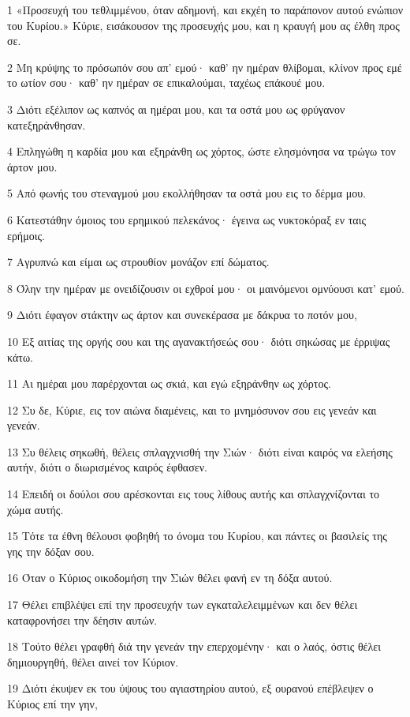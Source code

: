 \par 1 «Προσευχή του τεθλιμμένου, όταν αδημονή, και εκχέη το παράπονον αυτού ενώπιον του Κυρίου.» Κύριε, εισάκουσον της προσευχής μου, και η κραυγή μου ας έλθη προς σε.
\par 2 Μη κρύψης το πρόσωπόν σου απ' εμού· καθ' ην ημέραν θλίβομαι, κλίνον προς εμέ το ωτίον σου· καθ' ην ημέραν σε επικαλούμαι, ταχέως επάκουέ μου.
\par 3 Διότι εξέλιπον ως καπνός αι ημέραι μου, και τα οστά μου ως φρύγανον κατεξηράνθησαν.
\par 4 Επληγώθη η καρδία μου και εξηράνθη ως χόρτος, ώστε ελησμόνησα να τρώγω τον άρτον μου.
\par 5 Από φωνής του στεναγμού μου εκολλήθησαν τα οστά μου εις το δέρμα μου.
\par 6 Κατεστάθην όμοιος του ερημικού πελεκάνος· έγεινα ως νυκτοκόραξ εν ταις ερήμοις.
\par 7 Αγρυπνώ και είμαι ως στρουθίον μονάζον επί δώματος.
\par 8 Όλην την ημέραν με ονειδίζουσιν οι εχθροί μου· οι μαινόμενοι ομνύουσι κατ' εμού.
\par 9 Διότι έφαγον στάκτην ως άρτον και συνεκέρασα με δάκρυα το ποτόν μου,
\par 10 Εξ αιτίας της οργής σου και της αγανακτήσεώς σου· διότι σηκώσας με έρριψας κάτω.
\par 11 Αι ημέραι μου παρέρχονται ως σκιά, και εγώ εξηράνθην ως χόρτος.
\par 12 Συ δε, Κύριε, εις τον αιώνα διαμένεις, και το μνημόσυνον σου εις γενεάν και γενεάν.
\par 13 Συ θέλεις σηκωθή, θέλεις σπλαγχνισθή την Σιών· διότι είναι καιρός να ελεήσης αυτήν, διότι ο διωρισμένος καιρός έφθασεν.
\par 14 Επειδή οι δούλοι σου αρέσκονται εις τους λίθους αυτής και σπλαγχνίζονται το χώμα αυτής.
\par 15 Τότε τα έθνη θέλουσι φοβηθή το όνομα του Κυρίου, και πάντες οι βασιλείς της γης την δόξαν σου.
\par 16 Όταν ο Κύριος οικοδομήση την Σιών θέλει φανή εν τη δόξα αυτού.
\par 17 Θέλει επιβλέψει επί την προσευχήν των εγκαταλελειμμένων και δεν θέλει καταφρονήσει την δέησιν αυτών.
\par 18 Τούτο θέλει γραφθή διά την γενεάν την επερχομένην· και ο λαός, όστις θέλει δημιουργηθή, θέλει αινεί τον Κύριον.
\par 19 Διότι έκυψεν εκ του ύψους του αγιαστηρίου αυτού, εξ ουρανού επέβλεψεν ο Κύριος επί την γην,

